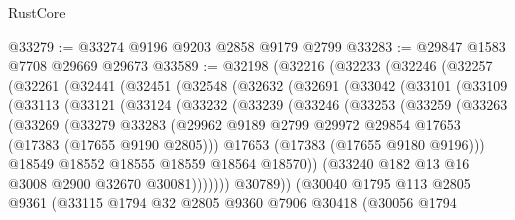\begin{lexlean}{RustCore}
\begin{coremodule}
@33279 := @33274 @9196 @9203 @2858 @9179 @2799
@33283 := @29847 @1583 @7708 @29669 @29673
@33589 := @32198
    (@32216
      (@32233
        (@32246
          (@32257
            (@32261
              (@32441
                (@32451
                  (@32548
                    (@32632
                      (@32691
                        (@33042
                          (@33101
                            (@33109
                              (@33113
                                (@33121
                                  (@33124
                                    (@33232
                                      (@33239
                                        (@33246
                                          (@33253
                                            (@33259
                                              (@33263
                                                (@33269
                                                  (@33279
                                                    @33283
                                                    (@29962
                                                      @9189
                                                      @2799
                                                      @29972
                                                      @29854
                                                      @17653
                                                      (@17383 (@17655 @9190 @2805)))
                                                    @17653
                                                    (@17383 (@17655 @9180 @9196)))
                                                  @18549
                                                  @18552
                                                  @18555
                                                  @18559
                                                  @18564
                                                  @18570))
                                              (@33240 @182 @13 @16 @3008 @2900 @32670 @30081)))))))
                                  @30789))
                              (@30040
                                @1795
                                @113
                                @2805
                                @9361
                                (@33115
                                  @1794
                                  @32
                                  @2805
                                  @9360
                                  @7906
                                  @30418
                                  (@30056
                                    @1794

\end{coremodule}
\end{lexlean}
